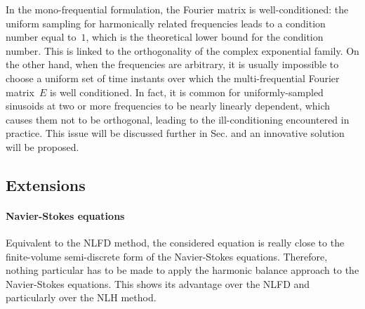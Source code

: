 In the mono-frequential formulation, 
the Fourier matrix is well-conditioned: the
uniform sampling for harmonically related frequencies leads to a
condition number equal to~$1$, which is the theoretical lower bound
for the condition number.  This is linked to the orthogonality of the
complex exponential family.  On the other hand, when the frequencies are arbitrary, it is usually
impossible to choose a uniform set of time instants over which the
multi-frequential Fourier matrix~$E$ is well conditioned. In fact, it is common for uniformly-sampled
sinusoids at two or more frequencies to be nearly linearly dependent,
which causes them not to be orthogonal, leading to the
ill-conditioning encountered in practice. This issue will be discussed
further in Sec. and an innovative
solution will be proposed.

\subsection{Extensions}

\paragraph{Navier-Stokes equations}
Equivalent to the NLFD method, the
considered equation is really close to the finite-volume
semi-discrete form of the Navier-Stokes equations. Therefore,
nothing particular has to be made to apply the harmonic balance approach
to the Navier-Stokes equations.
This shows its advantage over the NLFD and particularly over the NLH method.

